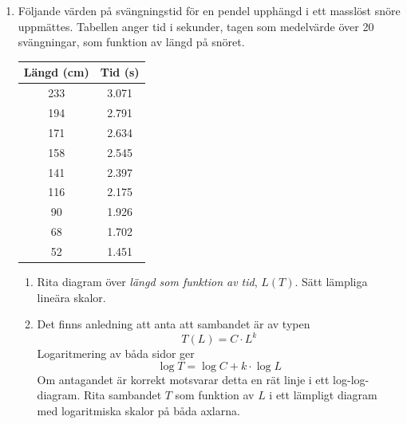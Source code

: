 \documentclass[onepage,swedish,a4paper,12pt]{scrbook}
\begin{document}
\begin{multicols}{2}
\begin{enumerate}

\item Följande värden på svängningstid för en pendel upphängd i ett masslöst snöre uppmättes. Tabellen anger tid i sekunder, tagen som medelvärde över 20 svängningar, som funktion av längd på snöret.

\begin{tabular}{cc}
Längd (cm) & Tid (s)\\
\hline
233   & 3.071 \\
194   & 2.791 \\ 
171   & 2.634 \\
158   & 2.545 \\
141   & 2.397 \\ 
116   & 2.175 \\ 
90    & 1.926 \\
68    & 1.702 \\
52    & 1.451 \\
\hline
\end{tabular}

\vspace{2cm}

\begin{enumerate}
\item Rita diagram över \emph{längd som funktion av tid}, $L(T)$. Sätt lämpliga lineära skalor.
\item Det finns anledning att anta att sambandet är av typen \[ T(L)=C\cdot L^k \] Logaritmering av båda sidor ger \[ \log T = \log C + k\cdot\log L  \] Om antagandet är korrekt motsvarar detta en rät linje i ett log-log-diagram. Rita sambandet $T$ som funktion av $L$ i ett lämpligt diagram med logaritmiska skalor på båda axlarna. 
\end{enumerate}




\end{enumerate}

\end{multicols}
\end{document}
